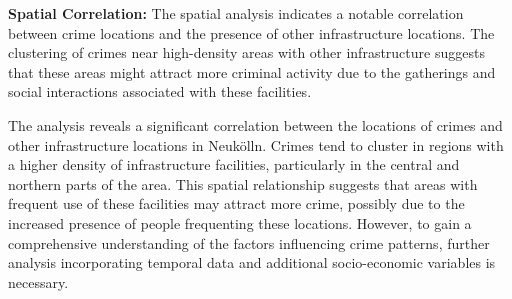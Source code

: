  \textbf{Spatial Correlation:} The spatial analysis indicates a notable correlation between crime locations and the presence of other infrastructure locations. The clustering of crimes near high-density areas with other infrastructure suggests that these areas might attract more criminal activity due to the gatherings and social interactions associated with these facilities. 

The analysis reveals a significant correlation between the locations of crimes and other infrastructure locations in Neukölln. Crimes tend to cluster in regions with a higher density of infrastructure facilities, particularly in the central and northern parts of the area. This spatial relationship suggests that areas with frequent use of these facilities may attract more crime, possibly due to the increased presence of people frequenting these locations. However, to gain a comprehensive understanding of the factors influencing crime patterns, further analysis incorporating temporal data and additional socio-economic variables is necessary. 